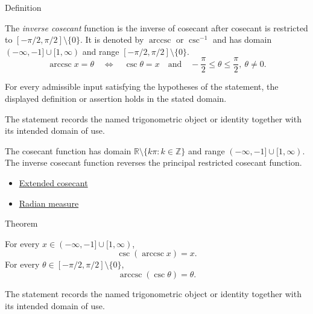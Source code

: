 

\begin{definitionbox}{Definition}
\begin{definition}
\label{def:inverse-cosecant}
The \emph{inverse cosecant} function is the inverse of cosecant after cosecant
is restricted to $[-\pi/2,\pi/2]\setminus\{0\}$. It is denoted by $\operatorname{arccsc}$
or $\csc^{-1}$ and has domain $(-\infty,-1]\cup[1,\infty)$ and range
$[-\pi/2,\pi/2]\setminus\{0\}$.
\[
  \operatorname{arccsc} x=\theta
  \quad\Longleftrightarrow\quad
  \csc\theta=x
  \quad\text{and}\quad
  -\frac{\pi}{2}\leq\theta\leq\frac{\pi}{2},\ \theta\neq 0.
\]
\end{definition}
\end{definitionbox}
\begin{remark*}
For every admissible input satisfying the hypotheses of the statement, the
displayed definition or assertion holds in the stated domain.
\end{remark*}

\begin{remark*}[Interpretation]
The statement records the named trigonometric object or identity together with
its intended domain of use.
\end{remark*}

\begin{remark*}
The cosecant function has domain
$\mathbb{R}\setminus\{k\pi:k\in\mathbb{Z}\}$ and range
$(-\infty,-1]\cup[1,\infty)$. The inverse cosecant function reverses the
principal restricted cosecant function.
\end{remark*}
\begin{dependencies}
\begin{itemize}
  \item \hyperref[def:extended-cosecant]{Extended cosecant}
  \item \hyperref[def:radian-measure]{Radian measure}
\end{itemize}
\end{dependencies}

\begin{theorembox}{Theorem}
\begin{theorem}
\label{thm:inverse-cosecant-identities}
For every $x\in(-\infty,-1]\cup[1,\infty)$,
\[
  \csc(\operatorname{arccsc} x)=x.
\]
For every $\theta\in[-\pi/2,\pi/2]\setminus\{0\}$,
\[
  \operatorname{arccsc}(\csc\theta)=\theta.
\]
\end{theorem}
\end{theorembox}
\begin{remark*}[Interpretation]
The statement records the named trigonometric object or identity together with
its intended domain of use.
\end{remark*}

